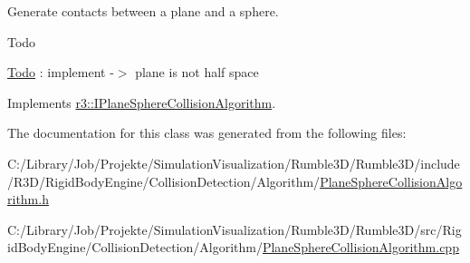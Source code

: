 Generate contacts between a plane and a sphere. 

\begin{DoxyRefDesc}{Todo}
\item[\mbox{\hyperlink{todo__todo000017}{Todo}}]\+: implement -\/$>$ plane is not half space \end{DoxyRefDesc}


Implements \mbox{\hyperlink{classr3_1_1_i_plane_sphere_collision_algorithm_a92ddfd3ba00ed53b183a6aef41b04a60}{r3\+::\+I\+Plane\+Sphere\+Collision\+Algorithm}}.



The documentation for this class was generated from the following files\+:\begin{DoxyCompactItemize}
\item 
C\+:/\+Library/\+Job/\+Projekte/\+Simulation\+Visualization/\+Rumble3\+D/\+Rumble3\+D/include/\+R3\+D/\+Rigid\+Body\+Engine/\+Collision\+Detection/\+Algorithm/\mbox{\hyperlink{_plane_sphere_collision_algorithm_8h}{Plane\+Sphere\+Collision\+Algorithm.\+h}}\item 
C\+:/\+Library/\+Job/\+Projekte/\+Simulation\+Visualization/\+Rumble3\+D/\+Rumble3\+D/src/\+Rigid\+Body\+Engine/\+Collision\+Detection/\+Algorithm/\mbox{\hyperlink{_plane_sphere_collision_algorithm_8cpp}{Plane\+Sphere\+Collision\+Algorithm.\+cpp}}\end{DoxyCompactItemize}
